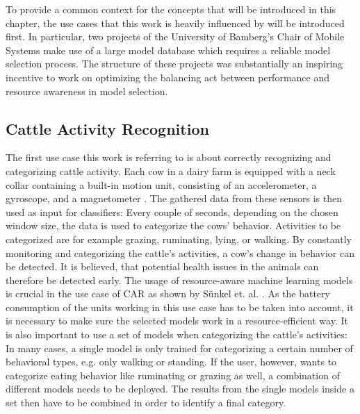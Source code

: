 To provide a common context for the concepts that will be introduced in this chapter, the use cases that this work is heavily influenced by will be introduced first. In particular, two projects of the University of Bamberg’s Chair of Mobile Systems make use of a large model database which requires a reliable model selection process. The structure of these projects was substantially an inspiring incentive to work on optimizing the balancing act between performance and resource awareness in model selection.

\subsection{Cattle Activity Recognition}\label{CAR}

The first use case this work is referring to is about correctly recognizing and categorizing cattle activity. Each cow in a dairy farm is equipped with a neck collar containing a built-in motion unit, consisting of an accelerometer, a gyroscope, and a magnetometer \cite{schmeling2021}. The gathered data from these sensors is then used as input for classifiers: Every couple of seconds, depending on the chosen window size, the data is used to categorize the cows’ behavior. Activities to be categorized are for example grazing, ruminating, lying, or walking. By constantly monitoring and categorizing the cattle’s activities, a cow’s change in behavior can be detected. It is believed, that potential health issues in the animals can therefore be detected early. The usage of resource-aware machine learning models is crucial in the use case of CAR as shown by Sünkel et. al. \cite{sunkel2022}. As the battery consumption of the units working in this use case has to be taken into account, it is necessary to make sure the selected models work in a resource-efficient way. It is also important to use a set of models when categorizing the cattle’s activities: In many cases, a single model is only trained for categorizing a certain number of behavioral types, e.g. only walking or standing. If the user, however, wants to categorize eating behavior like ruminating or grazing as well, a combination of different models needs to be deployed. The results from the single models inside a set then have to be combined in order to identify a final category. 

